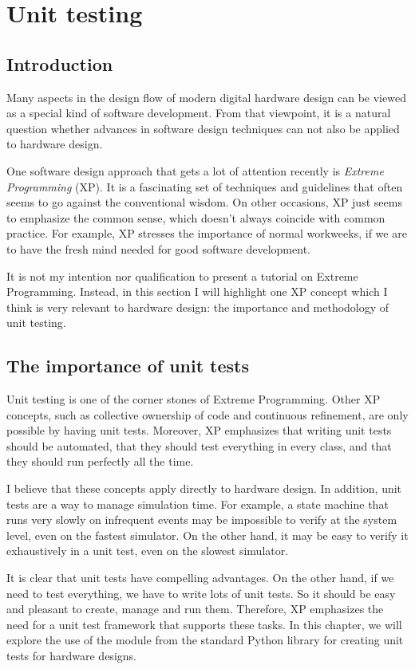 \chapter{Unit testing}

\section{Introduction}

Many aspects in the design flow of modern digital hardware design can
be viewed as a special kind of software development. From that
viewpoint, it is a natural question whether advances in software
design techniques can not also be applied to hardware design.

One software design approach that gets a lot of attention recently is
\emph{Extreme Programming} (XP). It is a fascinating set of techniques and
guidelines that often seems to go against the conventional wisdom. On
other occasions, XP just seems to emphasize the common sense, which
doesn't always coincide with common practice. For example, XP stresses
the importance of normal workweeks, if we are to have the
fresh mind needed for good software development.

It is not my intention nor qualification to present a tutorial on
Extreme Programming. Instead, in this section I will highlight one XP
concept which I think is very relevant to hardware design: the
importance and methodology of unit testing.

\section{The importance of unit tests}

Unit testing is one of the corner stones of Extreme Programming. Other
XP concepts, such as collective ownership of code and continuous
refinement, are only possible by having unit tests. Moreover, XP
emphasizes that writing unit tests should be automated, that they should
test everything in every class, and that they should run perfectly all
the time. 

I believe that these concepts apply directly to hardware design. In
addition, unit tests are a way to manage simulation time. For example,
a state machine that runs very slowly on infrequent events may be
impossible to verify at the system level, even on the fastest
simulator. On the other hand, it may be easy to verify it exhaustively
in a unit test, even on the slowest simulator.

It is clear that unit tests have compelling advantages. On the other
hand, if we need to test everything, we have to write
lots of unit tests. So it should be easy and pleasant
to create, manage and run them. Therefore, XP emphasizes the need for
a unit test framework that supports these tasks. In this chapter,
we will explore the use of the  module from
the standard Python library for creating unit tests for hardware
designs.


